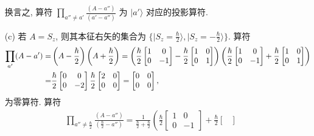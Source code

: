 \documentclass{assignment}
\begin{document}
\begin{sol}
\begin{itemize}
        换言之, 算符 $\prod_{a''\neq a'}\frac{(A-a'')}{(a'-a'')}$ 为 $\lvert a'\rangle$ 对应的投影算符.
        \item[(c)] 若 $A=S_z$, 则其本征右矢的集合为 $\{\lvert S_z=\frac{\hbar}{2}\rangle,\lvert S_z=-\frac{\hbar}{2}\rangle\}$. 算符
        \begin{align}
            \notag\prod_{a'}(A-a')=&\left(A-\frac{\hbar}{2}\right)\left(A+\frac{\hbar}{2}\right)=\left(\frac{\hbar}{2}\begin{bmatrix}
                1&0\\
                0&-1
            \end{bmatrix}-\frac{\hbar}{2}\begin{bmatrix}
                1&0\\
                0&1
            \end{bmatrix}\right)\left(\frac{\hbar}{2}\begin{bmatrix}
                1&0\\
                0&-1
            \end{bmatrix}+\frac{\hbar}{2}\begin{bmatrix}
                1&0\\
                0&1
            \end{bmatrix}\right)\\
            =&\frac{\hbar}{2}\begin{bmatrix}
                0&0\\
                0&-2
            \end{bmatrix}\frac{\hbar}{2}\begin{bmatrix}
                2&0\\
                0&0
            \end{bmatrix}=\begin{bmatrix}
                0&0\\
                0&0
            \end{bmatrix},
        \end{align}
        为零算符.
        算符
        \begin{align}
            \prod_{a''\neq\frac{\hbar}{2}}\frac{(A-a'')}{\left(\frac{\hbar}{2}-a''\right)}=\frac{1}{\frac{\hbar}{2}+\frac{\hbar}{2}}\left(\frac{\hbar}{2}\begin{bmatrix}
                1&0\\
                0&-1
            \end{bmatrix}+\frac{\hbar}{2}\begin{bmatrix}

\end{bmatrix}
\end{align}
\end{itemize}
\end{sol}
\end{document}
